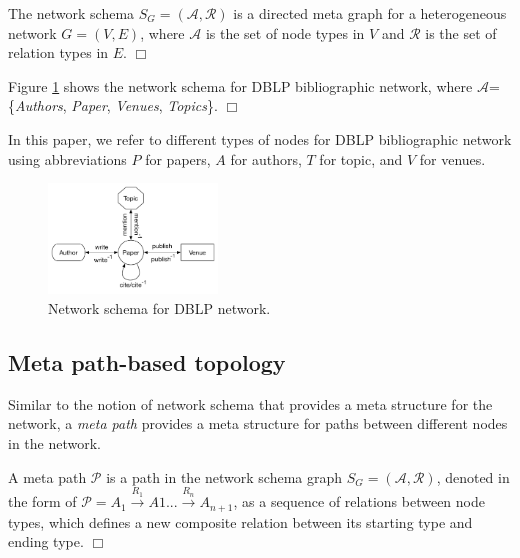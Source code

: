 \begin{definition}
The network schema $S_G=\mathcal{(A,R)}$ is a directed meta graph for a heterogeneous network $G=(V,E)$, where $\mathcal{A}$ is the set of node types in $V$ and $\mathcal{R}$ is the set of relation types in $E$.  $\Box$
\end{definition}

\begin{example}
Figure \ref{schema} shows the network schema for DBLP bibliographic network, where $\mathcal{A}$=\{\textit{Authors}, \textit{Paper}, \textit{Venues}, \textit{Topics}\}. $\Box$
\end{example}

In this paper, we refer to different types of nodes for DBLP bibliographic network using abbreviations $P$ for papers, $A$ for authors, $T$ for topic, and $V$ for venues. 

\begin{figure}[t]
  \centering
      \includegraphics[width=0.4\textwidth]{figs/schema.pdf}
  \caption{Network schema for DBLP network.}\label{schema}
\end{figure}

\subsection{Meta path-based topology}

Similar to the notion of network schema that provides a meta structure for the network, a \textit{meta path} \cite{sun2011pathsim} provides a meta structure for paths between different nodes in the network. 

\begin{definition}
A meta path $\mathcal{P}$ is a path in the network schema graph $S_G = (\mathcal{A,R})$, denoted in the form of $\mathcal{P} = A_1 \xrightarrow{R_1} A1... \xrightarrow{R_n} A_{n+1}$, as a sequence of relations between node types, which defines a new composite relation between its starting type and ending type. $\Box$
\end{definition}



